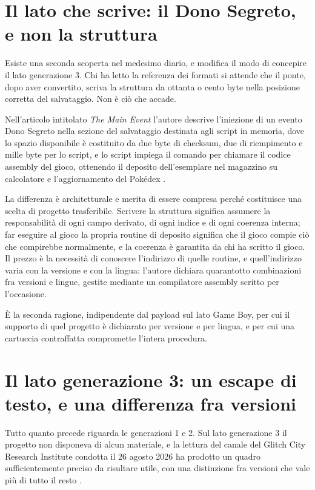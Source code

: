 \section{Il lato che scrive: il Dono Segreto, e non la struttura}

Esiste una seconda scoperta nel medesimo diario, e modifica il modo di concepire il lato generazione 3. Chi ha letto la referenza dei formati si attende che il ponte, dopo aver convertito, scriva la struttura da ottanta o cento byte nella posizione corretta del salvataggio. Non è ciò che accade.

Nell'articolo intitolato \emph{The Main Event} l'autore descrive l'iniezione di un evento Dono Segreto nella sezione del salvataggio destinata agli script in memoria, dove lo spazio disponibile è costituito da due byte di checksum, due di riempimento e mille byte per lo script, e lo script impiega il comando  per chiamare il codice assembly del gioco, ottenendo il deposito dell'esemplare nel magazzino su calcolatore e l'aggiornamento del Pokédex \cite{devlog-ptgb}.

La differenza è architetturale e merita di essere compresa perché costituisce una scelta di progetto trasferibile. Scrivere la struttura significa assumere la responsabilità di ogni campo derivato, di ogni indice e di ogni coerenza interna; far eseguire al gioco la propria routine di deposito significa che il gioco compie ciò che compirebbe normalmente, e la coerenza è garantita da chi ha scritto il gioco. Il prezzo è la necessità di conoscere l'indirizzo di quelle routine, e quell'indirizzo varia con la versione e con la lingua: l'autore dichiara quarantotto combinazioni fra versioni e lingue, gestite mediante un compilatore assembly scritto per l'occasione.

È la seconda ragione, indipendente dal payload sul lato Game Boy, per cui il supporto di quel progetto è dichiarato per versione e per lingua, e per cui una cartuccia contraffatta compromette l'intera procedura.

\section{Il lato generazione 3: un escape di testo, e una differenza fra versioni}

Tutto quanto precede riguarda le generazioni 1 e 2. Sul lato generazione 3 il progetto non disponeva di alcun materiale, e la lettura del canale del Glitch City Research Institute condotta il 26 agosto 2026 ha prodotto un quadro sufficientemente preciso da risultare utile, con una distinzione fra versioni che vale più di tutto il resto \cite{gcri-discord}.

